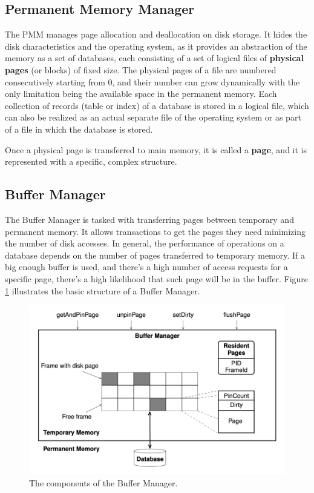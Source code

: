 \subsection{Permanent Memory Manager}

The PMM manages page allocation and deallocation on disk storage. It hides the disk characteristics and the operating system, as it provides an abstraction of the memory as a set of databases, each consisting of a set of logical files of \textbf{physical pages} (or blocks) of fixed size. The physical pages of a file are numbered consecutively starting from 0, and their number can grow dynamically with the only limitation being the available space in the permanent memory. Each collection of records (table or index) of a database is stored in a logical file, which can also be realized as an actual separate file of the operating system or as part of a file in which the database is stored.

Once a physical page is transferred to main memory, it is called a \textbf{page}, and it is represented with a specific, complex structure.

\subsection{Buffer Manager}

The Buffer Manager is tasked with transferring pages between temporary and permanent memory. It allows transactions to get the pages they need minimizing the number of disk accesses. In general, the performance of operations on a database depends on the number of pages transferred to temporary memory. If a big enough buffer is used, and there's a high number of access requests for a specific page, there's a high likelihood that such page will be in the buffer. Figure \ref{fig:buffermanager} illustrates the basic structure of a Buffer Manager.

\begin{figure}[ht]
    \centering
    \includegraphics[width=0.5\linewidth]{img/Buffer Manager.png}
    \caption{The components of the Buffer Manager.}
    \label{fig:buffermanager}
\end{figure}

